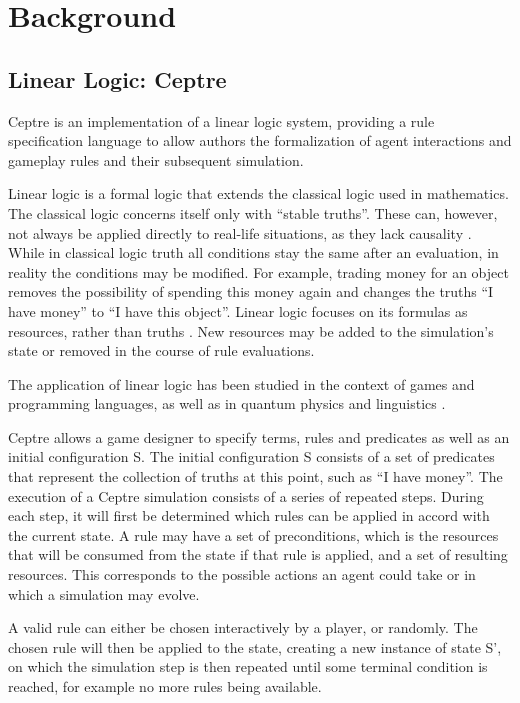 \section{Background} \label{background}

\subsection{Linear Logic: Ceptre} \label{linear_logic}

Ceptre is an implementation of a linear logic system, providing a rule specification language to allow authors the formalization of agent interactions and gameplay rules and their subsequent simulation.

Linear logic is a formal logic that extends the classical logic used in mathematics.
The classical logic concerns itself only with \enquote{stable truths}.
These can, however, not always be applied directly to real-life situations, as they lack causality \cite{girard_1995}.
While in classical logic truth all conditions stay the same after an evaluation, in reality the conditions may be modified.
For example, trading money for an object removes the possibility of spending this money again and changes the truths \enquote{I have money} to \enquote{I have this object}.
Linear logic focuses on its formulas as resources, rather than truths \cite{sep-logic-linear}.
New resources may be added to the simulation's state or removed in the course of rule evaluations.

The application of linear logic has been studied in the context of games and programming languages, as well as in quantum physics and linguistics \cite{sep-logic-linear}. 

Ceptre allows a game designer to specify terms, rules and predicates as well as an initial configuration S.
The initial configuration S consists of a set of predicates that represent the collection of truths at this point, such as \enquote{I have money}.
The execution of a Ceptre simulation consists of a series of repeated steps.
During each step, it will first be determined which rules can be applied in accord with the current state.
A rule may have a set of preconditions, which is the resources that will be consumed from the state if that rule is applied, and a set of resulting resources.
This corresponds to the possible actions an agent could take or in which a simulation may evolve.

A valid rule can either be chosen interactively by a player, or randomly. 
The chosen rule will then be applied to the state, creating a new instance of state S', on which the simulation step is then repeated until some terminal condition is reached, for example no more rules being available.
